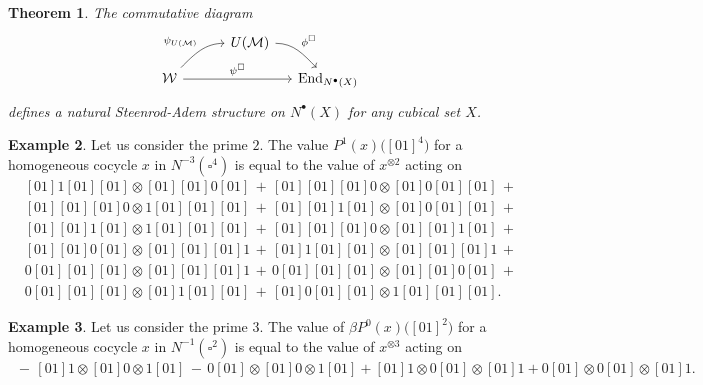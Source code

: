 \documentclass[A4]{amsart}
\newtheorem{theorem}{Theorem}
\theoremstyle{definition}
\newtheorem{example}[theorem]{Example}
\newcommand{\End}{\mathrm{End}}
\begin{document}
\begin{theorem}
	The commutative diagram
	\begin{equation*}
	\begin{tikzcd}[column sep = small, row sep = small]
	&[18pt] U(\mathcal M) \arrow[dr, "\phi^\square", out=0] &[-0pt] \\
	\mathcal W \arrow[ur, "\psi_{U(\mathcal M)}", in=180] \arrow[rr, "\psi^\square"] & & \End_{N^\bullet (X)}
	\end{tikzcd}
	\end{equation*}
	defines a natural Steenrod-Adem structure on $N^\bullet(X)$ for any cubical set $X$.
\end{theorem}

\begin{example}
	Let us consider the prime $2$. The value $P^1(x)\big([01]^{4}\big)$ for a homogeneous cocycle $x$ in $N^{-3}(\square^4)$ is equal to the value of $x^{\otimes 2}$ acting on
	\begin{align*}&
	[01]1[01][01] \otimes [01][01]0[01]\,+\,
	[01][01][01]0 \otimes [01]0[01][01]\,+\, \\&
	[01][01][01]0 \otimes 1[01][01][01]\,+\,
	[01][01]1[01] \otimes [01]0[01][01]\,+\, \\&
	[01][01]1[01] \otimes 1[01][01][01]\,+\,
	[01][01][01]0 \otimes [01][01]1[01]\,+\, \\&
	[01][01]0[01] \otimes [01][01][01]1\,+\,
	[01]1[01][01] \otimes [01][01][01]1\,+\, \\&
	0[01][01][01] \otimes [01][01][01]1\,+\,
	0[01][01][01] \otimes [01][01]0[01]\,+\, \\&
	0[01][01][01] \otimes [01]1[01][01]\,+\,
	[01]0[01][01] \otimes 1[01][01][01].\,\phantom{+}\,
	\end{align*}
\end{example}

\begin{example}
	Let us consider the prime $3$. The value of $\beta P^0(x)\big([01]^2\big)$ for a homogeneous cocycle $x$ in $N^{-1}(\square^2)$ is equal to the value of $x^{\otimes 3}$ acting on
	\begin{align*}
	\,-\, [01]1 \otimes [01]0 \otimes 1[01] \,-\, 0[01] \otimes [01]0 \otimes 1[01] + [01]1 \otimes 0[01] \otimes [01]1 + 0[01] \otimes 0[01] \otimes [01]1.
	\end{align*}
\end{example}
\end{document}
